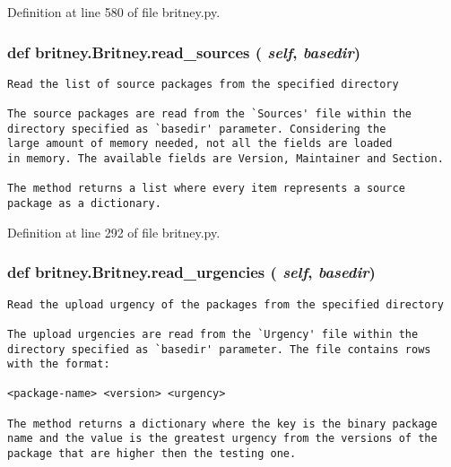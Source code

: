 Definition at line 580 of file britney.py.
\subsubsection{\setlength{\rightskip}{0pt plus 5cm}def britney.Britney.read\_\-sources ( {\em self},  {\em basedir})}\label{classbritney_1_1Britney_054f44c47f17c0c4f5a069e821b7f868}




\footnotesize\begin{verbatim}Read the list of source packages from the specified directory

The source packages are read from the `Sources' file within the
directory specified as `basedir' parameter. Considering the
large amount of memory needed, not all the fields are loaded
in memory. The available fields are Version, Maintainer and Section.

The method returns a list where every item represents a source
package as a dictionary.
\end{verbatim}
\normalsize
 

Definition at line 292 of file britney.py.
\subsubsection{\setlength{\rightskip}{0pt plus 5cm}def britney.Britney.read\_\-urgencies ( {\em self},  {\em basedir})}\label{classbritney_1_1Britney_09fc27899506b4830b1961f125a7b6a4}




\footnotesize\begin{verbatim}Read the upload urgency of the packages from the specified directory

The upload urgencies are read from the `Urgency' file within the
directory specified as `basedir' parameter. The file contains rows
with the format:

<package-name> <version> <urgency>

The method returns a dictionary where the key is the binary package
name and the value is the greatest urgency from the versions of the
package that are higher then the testing one.
\end{verbatim}
\normalsize
 

